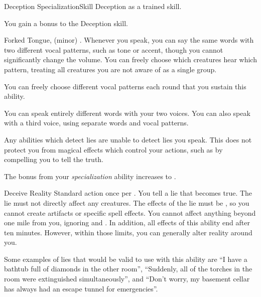     \begin{feat}{Deception Specialization}{Skill}
        \featpre Deception as a trained skill.

         You gain a  bonus to the Deception skill.

        \begin{sustainability}{Forked Tongue}{,  (minor)}
            \abilityusagetime {}.
            \rankline
            Whenever you speak, you can say the same words with two different vocal patterns, such as tone or accent, though you cannot significantly change the volume.
            You can freely choose which creatures hear which pattern, treating all creatures you are not aware of as a single group. 

            You can freely choose different vocal patterns each round that you sustain this ability.

            \rankline
             You can speak entirely different words with your two voices.
             You can also speak with a third voice, using separate words and vocal patterns.
        \end{sustainability}

         Any \magical abilities which detect lies are unable to detect lies you speak.
        This does not protect you from magical effects which control your actions, such as by compelling you to tell the truth.

         The bonus from your \textit{specialization} ability increases to .

        \begin{magicalactiveability}{Deceive Reality}
            \abilityusagetime Standard action once per .
            \rankline
            You tell a lie that becomes true.
            The lie must not directly affect any creatures.
            The effects of the lie must be , so you cannot create artifacts or specific spell effects.
            You cannot affect anything beyond one mile from you, ignoring  and .
            In addition, all effects of this ability end after ten minutes.
            However, within those limits, you can generally alter reality around you.

            Some examples of lies that would be valid to use with this ability are ``I have a bathtub full of diamonds in the other room'', ``Suddenly, all of the torches in the room were extinguished simultaneously'', and ``Don't worry, my basement cellar has always had an escape tunnel for emergencies''.
        \end{magicalactiveability}
    \end{feat}

